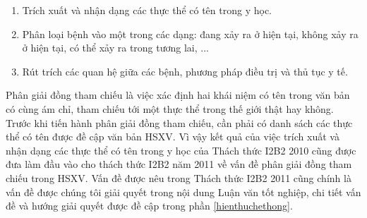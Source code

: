 \begin{enumerate}[leftmargin=\the\parindent]
\item Trích xuất và nhận dạng các thực thể có tên trong y học.
\item Phân loại bệnh vào một trong các dạng: đang xảy ra ở hiện tại, không xảy ra ở hiện tại, có thể xảy ra trong tương lai, ...
\item Rút trích các quan hệ giữa các bệnh, phương pháp điều trị và thủ tục y tế.
\end{enumerate}

Phân giải đồng tham chiếu là việc xác định hai khái niệm có tên trong văn bản có cùng ám chỉ, tham chiếu tới một thực thể trong thế giới thật hay không. Trước khi tiến hành phân giải đồng tham chiếu, cần phải có danh sách các thực thể có tên được đề cập văn bản HSXV. Vì vậy kết quả của việc trích xuất và nhận dạng các thực thể có tên trong y học của Thách thức I2B2 2010 cũng được đưa làm đầu vào cho thách thức I2B2 năm 2011 về vấn đề phân giải đồng tham chiếu trong HSXV. Vấn đề được nêu trong Thách thức I2B2 2011 cũng chính là vấn đề được chúng tôi giải quyết trong nội dung Luận văn tốt nghiệp, chi tiết vấn đề và hướng giải quyết được đề cập trong phần \ref{hienthuchethong}.